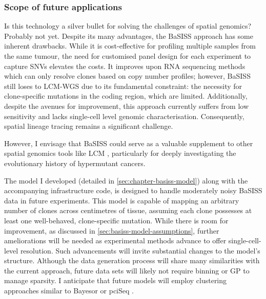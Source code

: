 \subsubsection*{Scope of future applications}

Is this technology a silver bullet for solving the challenges of spatial genomics? Probably not yet. Despite its many advantages, the \ac{BaSISS} approach has some inherent drawbacks. While it is cost-effective for profiling multiple samples from the same tumour, the need for customised panel design for each experiment to capture \acp{SNV} elevates the costs. It improves upon RNA sequencing methods which can only resolve clones based on copy number profiles; however, \ac{BaSISS} still loses to \ac{LCM}-\ac{WGS} due to its fundamental constraint: the necessity for clone-specific mutations in the coding region, which are limited. Additionally, despite the avenues for improvement, this approach currently suffers from low sensitivity and lacks single-cell level genomic characterisation. Consequently, spatial lineage tracing remains a significant challenge.


However, I envisage that \ac{BaSISS} could serve as a valuable supplement to other spatial genomics tools like \ac{LCM} , particularly for deeply investigating the evolutionary history of hypermutant cancers.

The model I developed (detailed in \cref{sec:chapter-basiss-model}) along with the accompanying infrastructure code, is designed to handle moderately noisy \ac{BaSISS} data in future experiments. This model is capable of mapping an arbitrary number of clones across centimetres of tissue, assuming each clone possesses at least one well-behaved, clone-specific mutation. While there is room for improvement, as discussed in \cref{sec:basiss-model-assumptions}, further ameliorations will be needed as experimental methods advance to offer single-cell-level resolution. Such advancements will invite substantial changes to the model's structure. Although the data generation process will share many similarities with the current approach, future data sets will likely not require binning or \ac{GP} to manage sparsity. I anticipate that future models will employ clustering approaches similar to Bayesor \parencite{Petukhov2022-pv} or pciSeq \parencite{Qian2020-mp}.

